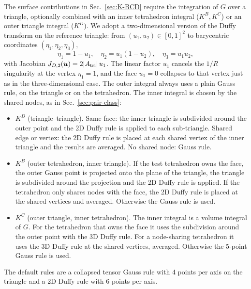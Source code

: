 \documentclass[11pt,a4paper]{article}
\begin{document}
The surface contributions in Sec.~\ref{sec:K-BCD} require the
integration of $G$ over a triangle, optionally combined with an inner
tetrahedron integral ($K^{B}, K^{C}$) or an outer triangle integral
($K^{D}$). We adopt a two-dimensional version of the Duffy transform on
the reference triangle: from $(u_1, u_2)\in[0,1]^{2}$ to barycentric
coordinates $(\eta_1, \eta_2, \eta_3)$,
\begin{equation}
  \eta_1 = 1 - u_1,\quad
  \eta_2 = u_1(1-u_2),\quad
  \eta_3 = u_1 u_2,
  \label{eq:duffy-2d}
\end{equation}
with Jacobian $J_{D,2}(\bm{u}) = 2\abs{A_{\text{tri}}}\,u_1$. The
linear factor $u_1$ cancels the $1/R$ singularity at the vertex $\eta_1
= 1$, and the face $u_1 = 0$ collapses to that vertex just as in the
three-dimensional case. The outer integral always uses a plain Gauss
rule, on the triangle or on the tetrahedron. The inner integral is
chosen by the shared nodes, as in Sec.~\ref{sec:pair-class}:
\begin{itemize}
  \item $K^{D}$ (triangle--triangle). Same face: the inner triangle is
        subdivided around the outer point and the 2D Duffy rule is
        applied to each sub-triangle. Shared edge or vertex: the 2D
        Duffy rule is placed at each shared vertex of the inner
        triangle and the results are averaged. No shared node: Gauss
        rule.
  \item $K^{B}$ (outer tetrahedron, inner triangle). If the test
        tetrahedron owns the face, the outer Gauss point is projected
        onto the plane of the triangle, the triangle is subdivided
        around the projection and the 2D Duffy rule is applied. If the
        tetrahedron only shares nodes with the face, the 2D Duffy rule
        is placed at the shared vertices and averaged. Otherwise the
        Gauss rule is used.
  \item $K^{C}$ (outer triangle, inner tetrahedron). The inner integral
        is a volume integral of $G$. For the tetrahedron that owns the
        face it uses the subdivision around the outer point with the 3D
        Duffy rule. For a node-sharing tetrahedron it uses the 3D Duffy
        rule at the shared vertices, averaged. Otherwise the 5-point
        Gauss rule is used.
\end{itemize}
The default rules are a collapsed tensor Gauss rule with 4 points per
axis on the triangle and a 2D Duffy rule with 6 points per axis.

\end{document}
